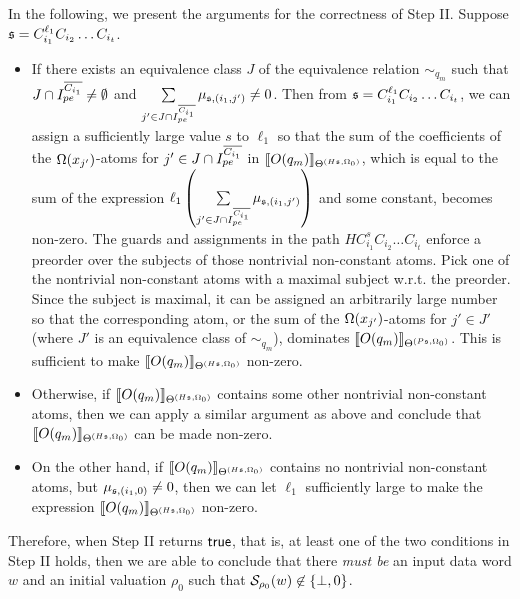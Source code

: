 \medskip
In the following, we present the arguments for the correctness of Step II. Suppose ${\mathfrak{s} } =C_{i_1}^{\ell_1} C_{i_2} \dots C_{i_t}$.
\begin{itemize}
\item If there exists an equivalence class $J$ of the equivalence relation $\sim_{q_m}$ such that $J \cap I^{\overline{C_{i_1}}}_{pe} \neq \emptyset$ and 
$\sum \limits_{j' \in  J \cap I^{\overline{C_{i_1}}}_{pe}} \mu_{{\mathfrak{s} },(i_1,j')} \neq 0$. 
Then from ${\mathfrak{s} }=C_{i_1}^{\ell_1} C_{i_2} \dots C_{i_t}$, we can assign a sufficiently large value $s$ to $\ell_1$ so that the sum of the coefficients of the $\Omega(x_{j'})$-atoms for $j' \in  J \cap I^{\overline{C_{i_1}}}_{pe}$ in $\llbracket O(q_{m})\rrbracket_{\Theta^{(H{\mathfrak{s} } ,\Omega_0)}}$, which is equal to the sum of the expression $\ell_1 \left(\sum \limits_{j' \in  J \cap I^{\overline{C_{i_1}}}_{pe}} \mu_{{\mathfrak{s} },(i_1,j')}\right)$ and some constant,  becomes non-zero.  The guards and assignments in the path $H C_{i_1}^{s} C_{i_2} \dots C_{i_t}$ enforce a preorder over the subjects of those nontrivial non-constant atoms.
Pick one of the nontrivial non-constant atoms with a maximal subject w.r.t. the preorder. Since the subject is maximal, it can be assigned an arbitrarily large number so that the corresponding atom, or the sum of the $\Omega(x_{j'})$-atoms for $j' \in J'$ (where $J'$ is an equivalence class of $\sim_{q_m}$), dominates $\llbracket O(q_{m})\rrbracket_{\Theta^{(P{\mathfrak{s} },\Omega_0)}}$.  This is sufficient to make $\llbracket O(q_{m})\rrbracket_{\Theta^{(H{\mathfrak{s} },\Omega_0)}}$ non-zero.
%
\item Otherwise, if $\llbracket O(q_{m})\rrbracket_{\Theta^{(H{\mathfrak{s} },\Omega_0)}}$ contains some other nontrivial non-constant atoms, then we can apply a similar argument as above and conclude that $\llbracket O(q_{m})\rrbracket_{\Theta^{(H{\mathfrak{s} },\Omega_0)}}$ can be made non-zero. 

\item On the other hand, if $\llbracket O(q_{m})\rrbracket_{\Theta^{(H{\mathfrak{s} },\Omega_0)}}$ contains no nontrivial non-constant atoms, but $\mu_{{\mathfrak{s} },(i_1,0)} \neq 0$, then we can let $\ell_1$ sufficiently large to make the expression $\llbracket O(q_{m})\rrbracket_{\Theta^{(H{\mathfrak{s} },\Omega_0)}}$ non-zero. 
\end{itemize} 
Therefore, when Step II returns $\mathsf{true}$, that is, at least one of the two conditions in Step II holds, then we are able to conclude that there \emph{must be}  an input data word $w$ and an initial valuation $\rho_0$ such that $ {\mathcal{S} }_{\rho_0}(w) \not \in \{\bot, 0\}$. 

